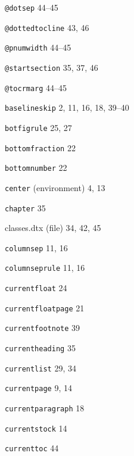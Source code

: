 \documentclass[11pt]{article}
\makeatletter
\newcommand{\tat}{@}
\providecommand{\indexfill}{}
\providecommand{\otherindexspace}[1]{}
\providecommand{\alphaindexspace}[1]{\indexspace{\bfseries #1}}
\makeatother
\begin{document}
\clearpage
%

% 
\begin{theindex}



\otherindexspace{?}


\item \texttt  {\bs \tat dotsep}  \indexfill
   44--45
\item \texttt  {\bs \tat dottedtocline}  \indexfill
   43, 46
\item \texttt  {\bs \tat pnumwidth}  \indexfill
   44--45
\item \texttt  {\bs \tat startsection}  \indexfill
   35, 37, 46
\item \texttt  {\bs \tat tocrmarg}  \indexfill
   44--45

\alphaindexspace{B}


\item \texttt  {\bs baselineskip}  \indexfill
   2, 11, 16, 18, 39--40
\item \texttt  {\bs botfigrule}  \indexfill
   25, 27
\item \texttt  {\bs bottomfraction}  \indexfill
   22
\item \texttt  {\bs bottomnumber}  \indexfill
   22

\alphaindexspace{C}


\item \texttt  {center} (environment)  \indexfill
   4, 13
\item \texttt  {\bs chapter}  \indexfill
   35
\item {\textsf  {classes.dtx} (file)}  \indexfill
   34, 42, 45
\item \texttt  {\bs columnsep}  \indexfill
   11, 16
\item \texttt  {\bs columnseprule}  \indexfill
   11, 16
\item \texttt  {\bs currentfloat}  \indexfill
   24
\item \texttt  {\bs currentfloatpage}  \indexfill
   21
\item \texttt  {\bs currentfootnote}  \indexfill
   39
\item \texttt  {\bs currentheading}  \indexfill
   35
\item \texttt  {\bs currentlist}  \indexfill
   29, 34
\item \texttt  {\bs currentpage}  \indexfill
   9, 14
\item \texttt  {\bs currentparagraph}  \indexfill
   18
\item \texttt  {\bs currentstock}  \indexfill
   14
\item \texttt  {\bs currenttoc}  \indexfill
   44


\end{theindex}
\end{document}
